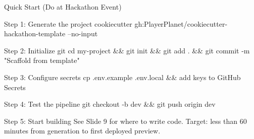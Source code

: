 \documentclass[10pt,aspectratio=169,t]{beamer}
\begin{document}
\begin{frame}{Quick Start (Do at Hackathon Event)}

  \begin{block}{Step 1: Generate the project}
    \ttfamily\scriptsize
    cookiecutter gh:PlayerPlanet/cookiecutter-hackathon-template --no-input
  \end{block}

  \begin{block}{Step 2: Initialize git}
    \ttfamily\scriptsize
    cd my-project \&\& git init \&\& git add . \&\& git commit -m "Scaffold from template"
  \end{block}

  \begin{block}{Step 3: Configure secrets}
    \ttfamily\scriptsize
    cp .env.example .env.local  \&\&  add keys to GitHub Secrets
  \end{block}

  \begin{block}{Step 4: Test the pipeline}
    \ttfamily\scriptsize
    git checkout -b dev \&\& git push origin dev
  \end{block}

  \begin{block}{Step 5: Start building}
    See Slide 9 for where to write code. Target: less than 60 minutes from generation to first deployed preview.
  \end{block}

\end{frame}
\end{document}
